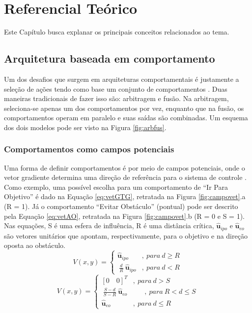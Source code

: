 \chapter{Referencial Teórico}
\vspace{-2.5 cm}

Este Capítulo busca explanar os principais conceitos relacionados ao tema. 

\section{Arquitetura baseada em comportamento}

Um dos desafios que surgem em arquiteturas comportamentais é justamente a
seleção de ações tendo como base um conjunto de comportamentos
\cite{Livro_Mataric}. Duas maneiras tradicionais de fazer isso são: arbitragem e
fusão. Na arbitragem, seleciona-se apenas um dos comportamentos por vez,
enquanto que na fusão, os comportamentos operam em paralelo e suas saídas são
combinadas. Um esquema dos dois modelos pode ser visto na Figura \ref{fig:arbfus}. 



\subsection{Comportamentos como campos potenciais}

Uma forma de definir comportamentos é por meio de campos potenciais, onde o
vetor gradiente determina uma direção de referência para o sistema de controle
\cite{book:arkin, art:wallfollowing}. Como exemplo, uma possível escolha para um
comportamento de ``Ir Para Objetivo'' é dado na Equação \ref{eq:vetGTG},
retratada na Figura \ref{fig:campovet}.a (R = 1). Já o comportamento ``Evitar
Obstáculo'' (pontual) pode ser descrito pela Equação \ref{eq:vetAO}, retratada
na Figura \ref{fig:campovet}.b (R = 0 e S = 1). Nas equações, S é uma esfera de
influência, R é uma distância crítica, $\mathbf{\hat{u}}_{ipo}$ e
$\mathbf{\hat{u}}_{eo}$ são vetores unitários que apontam, respectivamente,
para o objetivo e na direção oposta ao obstáculo.
\begin{equation}
	\label{eq:vetGTG}
	V(x,y) = \left \{ \begin{matrix} \mathbf{\hat{u}}_{ipo} &, \ para\ d \geq R \\
	\ \frac{d}{R}\ \mathbf{\hat{u}}_{ipo} &,\ para\ d < R \end{matrix} \right.
\end{equation}
\begin{equation}
	\label{eq:vetAO}
	V(x,y) = \left \{ \begin{matrix} [0\quad0]^{T} &, \ para\ d > S \\
	\ \frac{S-d}{S-R}\ \mathbf{\hat{u}}_{eo} &\quad \ \ \ ,\ para\ R < d \leq S \\
	\mathbf{\hat{u}}_{eo} &,\ para\ d \leq R \end{matrix} \right.
\end{equation} 

